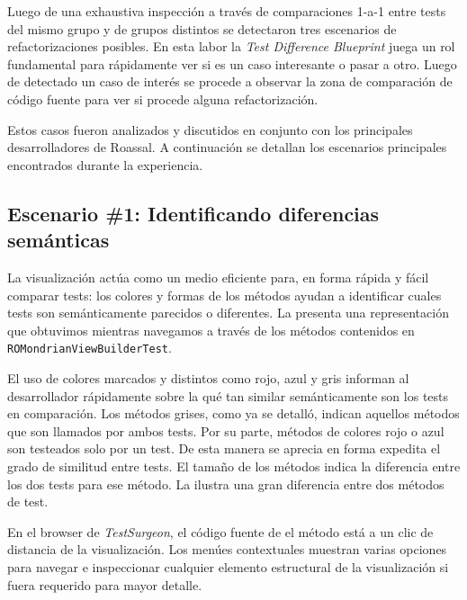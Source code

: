 \par Luego de una exhaustiva inspección a través de comparaciones 1-a-1 entre tests del mismo grupo y de grupos distintos se detectaron tres escenarios de refactorizaciones posibles. En esta labor la \emph{Test Difference Blueprint} juega un rol fundamental para rápidamente ver si es un caso interesante o pasar a otro. Luego de detectado un caso de interés se procede  a observar la zona de comparación de código fuente para ver si procede alguna refactorización.

\par Estos casos fueron analizados y discutidos en conjunto con los principales desarrolladores de Roassal. A continuación se detallan los escenarios principales encontrados durante la experiencia.


\subsection{Escenario \#1: Identificando diferencias semánticas}

\par La visualización actúa como un medio eficiente para, en forma rápida y fácil comparar tests: los colores y formas de los métodos ayudan a identificar cuales tests son semánticamente parecidos o diferentes.
La  presenta una representación que obtuvimos mientras navegamos a través de los métodos contenidos en {\tt ROMondrianViewBuilderTest}. 

\par El uso de colores marcados y distintos como rojo, azul y gris informan al desarrollador rápidamente sobre la qué tan similar semánticamente son los tests en comparación. Los métodos grises, como ya se detalló, indican aquellos métodos que son llamados por ambos tests. Por su parte, métodos de colores rojo o azul son testeados solo por un test. De esta manera se aprecia en forma expedita el grado de similitud entre tests. El tamaño de los métodos indica la diferencia entre los dos tests para ese método. La  ilustra una gran diferencia entre dos métodos de test.

\par En el browser de \emph{TestSurgeon}, el código fuente de el método está a un clic de distancia de la visualización. Los menúes contextuales muestran varias opciones para navegar e inspeccionar cualquier elemento estructural de la visualización si fuera requerido para mayor detalle.

